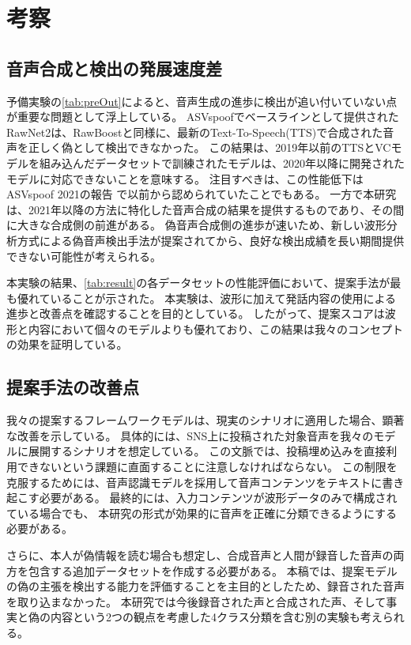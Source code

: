 \section{考察}\label{sec:cnt_evl}
\subsection{音声合成と検出の発展速度差}
予備実験の\cref{tab:preOut}によると、音声生成の進歩に検出が追い付いていない点が重要な問題として浮上している。
ASVspoofでベースラインとして提供されたRawNet2は、RawBoostと同様に、最新のText-To-Speech(TTS)で合成された音声を正しく偽として検出できなかった。
この結果は、2019年以前のTTSとVCモデルを組み込んだデータセットで訓練されたモデルは、2020年以降に開発されたモデルに対応できないことを意味する。
注目すべきは、この性能低下はASVspoof 2021の報告 \cite{yamagishi21_asvspoof}で以前から認められていたことでもある。
一方で本研究は、2021年以降の方法に特化した音声合成の結果を提供するものであり、その間に大きな合成側の前進がある。
偽音声合成側の進歩が速いため、新しい波形分析方式による偽音声検出手法が提案されてから、良好な検出成績を長い期間提供できない可能性が考えられる。

本実験の結果、\cref{tab:result}の各データセットの性能評価において、提案手法が最も優れていることが示された。
本実験は、波形に加えて発話内容の使用による進歩と改善点を確認することを目的としている。 
したがって、提案スコアは波形と内容において個々のモデルよりも優れており、この結果は我々のコンセプトの効果を証明している。

\subsection{提案手法の改善点}
我々の提案するフレームワークモデルは、現実のシナリオに適用した場合、顕著な改善を示している。
具体的には、SNS上に投稿された対象音声を我々のモデルに展開するシナリオを想定している。
この文脈では、投稿埋め込みを直接利用できないという課題に直面することに注意しなければならない。
この制限を克服するためには、音声認識モデルを採用して音声コンテンツをテキストに書き起こす必要がある。
最終的には、入力コンテンツが波形データのみで構成されている場合でも、
本研究の形式が効果的に音声を正確に分類できるようにする必要がある。

さらに、本人が偽情報を読む場合も想定し、合成音声と人間が録音した音声の両方を包含する追加データセットを作成する必要がある。
本稿では、提案モデルの偽の主張を検出する能力を評価することを主目的としたため、録音された音声を取り込まなかった。
本研究では今後録音された声と合成された声、そして事実と偽の内容という2つの観点を考慮した4クラス分類を含む別の実験も考えられる。